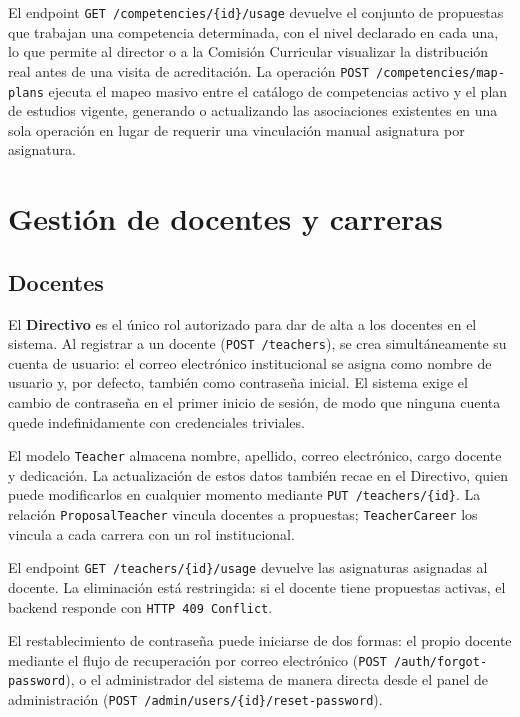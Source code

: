 El endpoint \texttt{GET /competencies/\{id\}/usage} devuelve el conjunto
de propuestas que trabajan una competencia determinada, con el nivel
declarado en cada una, lo que permite al director o a la Comisión
Curricular visualizar la distribución real antes de una visita de
acreditación.
La operación \texttt{POST /competencies/map-plans} ejecuta el mapeo
masivo entre el catálogo de competencias activo y el plan de estudios
vigente, generando o actualizando las asociaciones existentes en una
sola operación en lugar de requerir una vinculación manual asignatura
por asignatura.

\section{Gestión de docentes y carreras}
\label{sec:docentes_carreras}

\subsection{Docentes}
\label{subsec:docentes}

El \textbf{Directivo} es el único rol autorizado para dar de alta a los
docentes en el sistema.
Al registrar a un docente (\texttt{POST /teachers}), se crea
simultáneamente su cuenta de usuario: el correo electrónico
institucional se asigna como nombre de usuario y, por defecto,
también como contraseña inicial.
El sistema exige el cambio de contraseña en el primer inicio de sesión,
de modo que ninguna cuenta quede indefinidamente con credenciales
triviales.

El modelo \texttt{Teacher} almacena nombre, apellido, correo electrónico,
cargo docente y dedicación.
La actualización de estos datos también recae en el Directivo, quien
puede modificarlos en cualquier momento mediante \texttt{PUT /teachers/\{id\}}.
La relación \texttt{ProposalTeacher} vincula docentes a propuestas;
\texttt{TeacherCareer} los vincula a cada carrera con un rol institucional.

El endpoint \texttt{GET /teachers/\{id\}/usage} devuelve las asignaturas
asignadas al docente.
La eliminación está restringida: si el docente tiene propuestas activas,
el backend responde con \texttt{HTTP 409 Conflict}.

El restablecimiento de contraseña puede iniciarse de dos formas:
el propio docente mediante el flujo de recuperación por correo
electrónico (\texttt{POST /auth/forgot-password}),
o el administrador del sistema de manera directa desde el panel
de administración (\texttt{POST /admin/users/\{id\}/reset-password}).

